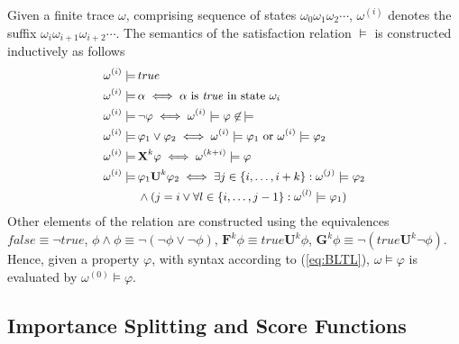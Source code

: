 \documentclass{llncs}
\begin{document}
Given a finite trace $\omega$, comprising sequence of states $\omega_{0}\omega_{1}\omega_{2}\cdots$,
$\omega^{(i)}$ denotes the suffix $\omega_{i}\omega_{i+1}\omega_{i+2}\cdots$.
The semantics of the satisfaction relation $\models$ is constructed
inductively as follows
\begin{equation}
\small\begin{split}\omega^{(i)}\models\, & true\\
\omega^{(i)}\models\, & \alpha\iff\alpha\textnormal{ is }\mathit{true}\textnormal{ in state }\omega_{i}\\
\omega^{(i)}\models\, & \neg\varphi\iff\omega^{(i)}\models\varphi\not\in\,\models\\
\omega^{(i)}\models\, & \varphi_{1}\vee\varphi_{2}\iff\omega^{(i)}\models\varphi_{1}\textnormal{ or }\omega^{(i)}\models\varphi_{2}\\
\omega^{(i)}\models\, & \mathbf{X}^{k}\varphi\iff\omega^{(k+i)}\models\varphi\\
\omega^{(i)}\models\, & \varphi_{1}\mathbf{U}^{k}\varphi_{2}\iff\exists j\in\{i,\dots,i+k\}:\omega^{(j)}\models\varphi_{2}\\
 & \wedge(j=i\vee\forall l\in\{i,\dots,j-1\}:\omega^{(l)}\models\varphi_{1})
\end{split}
\label{eq:semantics}
\end{equation}
Other elements of the relation are constructed using the equivalences
$\mathit{false}\equiv\neg\mathit{true}$, $\phi\wedge\phi\equiv\neg(\neg\phi\vee\neg\phi)$,
$\mathbf{F}^{k}\phi\equiv\mathit{true}\mathbf{U}^{k}\phi$, $\mathbf{G}^{k}\phi\equiv\neg(\mathit{true}\mathbf{U}^{k}\neg\phi)$.
Hence, given a property $\varphi$, with syntax according to (\ref{eq:BLTL}),
$\omega\models\varphi$ is evaluated by $\omega^{(0)}\models\varphi$.


\subsection*{Importance Splitting and Score Functions\label{sec:splitting}}
\end{document}

